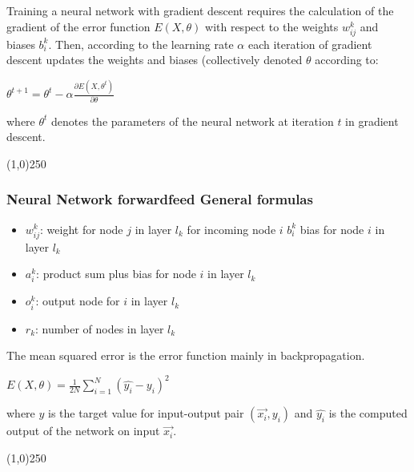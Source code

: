 \documentclass[journal]{IEEEtran}
\begin{document}
Training a neural network with gradient descent requires the calculation of the gradient of the error function $E(X, \theta)$ with respect to the weights $w_{ij}^k$ and biases $b_i^k$. Then, according to the learning rate $\alpha$  each iteration of gradient descent updates the weights and biases (collectively denoted $\theta$ according to:
\begin{center}
$\theta^{t+1} = \theta^{t} - \alpha \frac{\partial E(X, \theta^{t})}{\partial \theta}$
\end{center}
where $\theta^{t}$ denotes the parameters of the neural network at iteration $t$ in gradient descent.

\begin{center}
\line(1,0){250}
\end{center}
\subsubsection{Neural Network forwardfeed General formulas}
\begin{itemize}
    \item $w_{ij}^k$: weight for node $j$ in layer $l_k$ for incoming node $i$ $b_i^k$ bias for node $i$ in layer $l_k$
    \item $a_i^k$: product sum plus bias for node $i$ in layer $l_k$
    \item $o_i^k$: output node for $i$ in layer $l_k$
    \item $r_k$: number of nodes in layer $l_k$
\end{itemize}

The mean squared error is the error function mainly in backpropagation.
\begin{center}
    $E(X, \theta) = \frac{1}{2N} \sum_{i=1}^N \left(\hat{y_i} - y_i\right)^2$
\end{center}
where $y$ is the target value for input-output pair $(\vec{x_i},y_i)$ and $\hat{y_i}$ is the computed output of the network on input $\vec{x_i}$. 

\begin{center}
\line(1,0){250}
\end{center}
\end{document}

